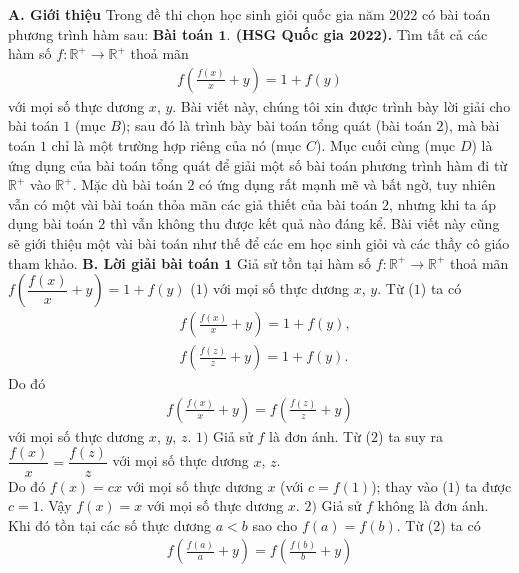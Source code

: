 \begin{multicols}{2}
	\textbf{\color{hoccungpi}A. Giới thiệu}
	\vskip 0.1cm
	Trong đề thi chọn học sinh giỏi quốc gia năm $2022$ có bài toán phương trình hàm sau:
	\vskip 0.1cm
	\textbf{\color{hoccungpi}Bài toán $\pmb{1.}$ (HSG Quốc gia $\pmb{2022}$).}
	Tìm tất cả các hàm số $f:\mathbb{R^+}  \rightarrow\mathbb{R^+} $ thoả mãn
	\begin{align*}
		f\left(\frac{f(x)}{x}+y\right)=1+f(y)
	\end{align*}
	với mọi số thực dương $x$, $y$.
	\vskip 0.1cm
	Bài viết này, chúng tôi xin được trình bày lời giải cho bài toán $1$ (mục $B$); sau đó là trình bày bài toán tổng quát (bài toán $2$), mà bài toán $1$ chỉ là một trường hợp riêng của nó (mục $C$). Mục cuối cùng (mục $D$) là ứng dụng của bài toán tổng quát để giải một số bài toán phương trình hàm đi từ $\mathbb R^+$ vào $\mathbb R^+$. 
	Mặc dù bài toán $2$ có ứng dụng rất mạnh mẽ và bất ngờ, tuy nhiên vẫn có một vài bài toán thỏa mãn các giả thiết của bài toán $2$, nhưng khi ta áp dụng bài toán  $2$ thì vẫn không thu được kết quả nào đáng kể. Bài viết này cũng sẽ giới thiệu một vài bài toán như thế để các em học sinh giỏi và các thầy cô giáo tham khảo.
	\vskip 0.1cm
	\textbf{\color{hoccungpi}B. Lời giải bài toán $\pmb{1}$}
	\vskip 0.1cm
	Giả sử tồn tại hàm số 
	$f:\mathbb{R^+}  \rightarrow\mathbb{R^+} $ thoả mãn
	\vskip 0.1cm
	\hspace*{40pt}$f\left(\dfrac{f(x)}{x}+y\right)=1+f(y)$ \hfill ($1$)
	\vskip 0.1cm
	với mọi số thực dương $x$, $y$.
	Từ ($1$) ta có
	\begin{align*}
		&f\left( {\frac{{f(x)}}{x} + y} \right)=1+f(y),\\
		&f\left( {\frac{{f(z)}}{z} + y} \right)=1+f(y).
	\end{align*}Do đó 
	\begin{align*}
		f\left( {\frac{{f(x)}}{x} + y} \right) = f\left( {\frac{{f(z)}}{z} + y} \right)\tag{$2$}
	\end{align*}
	với mọi số thực dương $x$, $y$, $z$.
	\vskip 0.1cm
	$1)$ Giả sử $f$ là đơn ánh.
		Từ ($2$) ta suy ra
		$\dfrac{{f(x)}}{x} = \dfrac{{f(z)}}{z}$ với mọi số thực dương $x$, $z$.\\
		Do đó $f(x) = cx$ với mọi số thực dương $x$ (với $c=f(1)$); thay vào ($1$) ta được
		$c=1$. Vậy
		$f(x) = x$ với mọi số thực dương $x$.
		\vskip 0.1cm
	$2)$ Giả sử $f$ không là đơn ánh.
		Khi đó tồn tại các số thực dương $a<b$ sao cho $f(a)=f(b)$.
		Từ ($2$) ta có
		\begin{align*}
			f\left( {\frac{{f(a)}}{a} + y} \right) = f\left( {\frac{{f(b)}}{b} + y} \right)

\end{align*}
\end{multicols}
